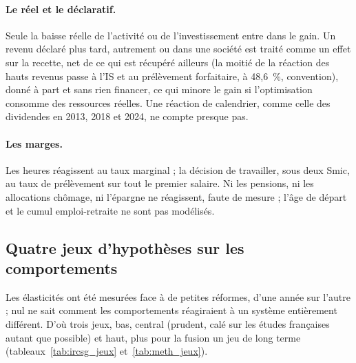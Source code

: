 \documentclass[11pt,a4paper]{article}
\begin{document}
\paragraph{Le réel et le déclaratif.} Seule la baisse réelle de l'activité ou de l'investissement entre dans le gain.
Un revenu déclaré plus tard, autrement ou dans une société est traité comme un effet sur la recette, net de ce qui est
récupéré ailleurs (la moitié de la réaction des hauts revenus passe à l'IS et au prélèvement forfaitaire, à 48,6~\%,
convention), donné à part et sans rien financer, ce qui minore le gain si l'optimisation consomme des ressources
réelles. Une réaction de calendrier, comme celle des dividendes en 2013, 2018 et 2024, ne compte presque pas.

\paragraph{Les marges.} Les heures réagissent au taux marginal ; la décision de travailler, sous deux Smic, au taux de
prélèvement sur tout le premier salaire. Ni les pensions, ni les allocations chômage, ni l'épargne ne réagissent, faute
de mesure ; l'âge de départ et le cumul emploi-retraite ne sont pas modélisés.

\subsection{Quatre jeux d'hypothèses sur les comportements}\label{ann:meth_jeux}

Les élasticités ont été mesurées face à de petites réformes, d'une année sur l'autre ; nul ne sait comment les
comportements réagiraient à un système entièrement différent. D'où trois jeux, bas, central (prudent, calé sur les
études françaises autant que possible) et haut, plus pour la fusion un jeu de long terme (tableaux~\ref{tab:ircsg_jeux}
et~\ref{tab:meth_jeux}).
\end{document}
